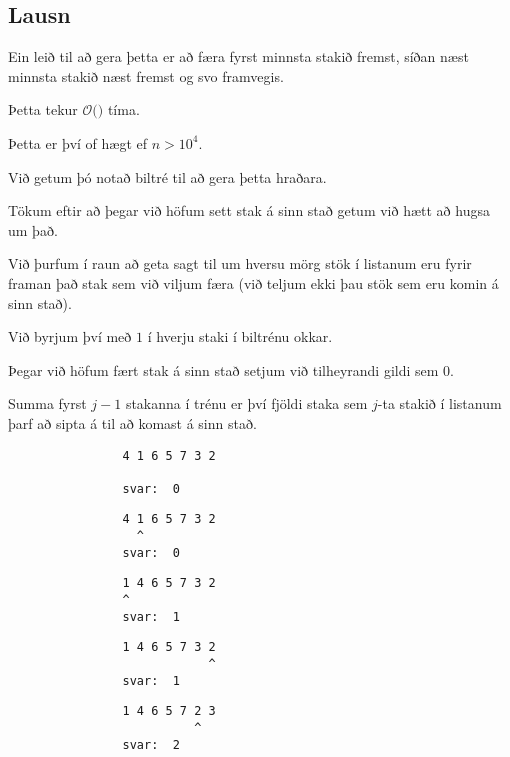 \subsection{Lausn}
{
    {
        \item<1-> Ein leið til að gera þetta er að færa fyrst minnsta stakið fremst, síðan næst minnsta stakið næst fremst og svo framvegis.
        \item<2-> Þetta tekur $\mathcal{O}($$)$ tíma.
        \item<4-> Þetta er því of hægt ef $n > 10^4$.
        \item<5-> Við getum þó notað biltré til að gera þetta hraðara.
        \item<6-> Tökum eftir að þegar við höfum sett stak á sinn stað getum við hætt að hugsa um það.
        \item<7-> Við þurfum í raun að geta sagt til um hversu mörg stök í listanum eru fyrir framan það stak sem við viljum færa
                (við teljum ekki þau stök sem eru komin á sinn stað).
        \item<8-> Við byrjum því með $1$ í hverju staki í biltrénu okkar.
        \item<9-> Þegar við höfum fært stak á sinn stað setjum við tilheyrandi gildi sem $0$.
        \item<10-> Summa fyrst $j - 1$ stakanna í trénu er því fjöldi staka sem $j$-ta stakið í listanum þarf að sipta á til að komast á sinn stað.
    }
}
{ \begin{verbatim}
                4 1 6 5 7 3 2

                svar:  0
\end{verbatim}}
{ \begin{verbatim}
                4 1 6 5 7 3 2
                  ^
                svar:  0
\end{verbatim}}
{ \begin{verbatim}
                1 4 6 5 7 3 2
                ^
                svar:  1
\end{verbatim}}
{ \begin{verbatim}
                1 4 6 5 7 3 2
                            ^
                svar:  1
\end{verbatim}}
{ \begin{verbatim}
                1 4 6 5 7 2 3
                          ^
                svar:  2
\end{verbatim}}
